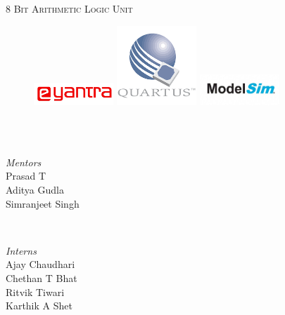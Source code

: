 \documentclass[12pt,singleside,a4paper]{article}
\begin{document}
 
\begin{titlepage}
	\centering
    \textsc{\LARGE 8 Bit Arithmetic Logic Unit}\\[2.0 cm]
\begin{figure}[!htb]
\centering
  \includegraphics[width=3cm,keepaspectratio]{logo.png}\textbf{ }\textbf{  }
  \includegraphics[width=3cm,keepaspectratio]{download.png}\textbf{  }
  \includegraphics[width=3cm,keepaspectratio]{modelsim-logo.jpg}
\end{figure}	\\[2cm]\
	\begin{minipage}{0.4\textwidth}
		\begin{flushleft} \large
			\emph{Mentors}\\
			Prasad T\\
            Aditya Gudla\\
            Simranjeet Singh \
			\end{flushleft}
			\end{minipage}~
			\begin{minipage}{0.4\textwidth}
            
			\begin{flushright} \large
			\emph{Interns} \\
			Ajay Chaudhari\\
            Chethan T Bhat\\
            Ritvik Tiwari \\
            Karthik A Shet \\
		\end{flushright}
	\end{minipage}\\[2 cm]
\end{titlepage}

\newpage


\tableofcontents
\end{document}
